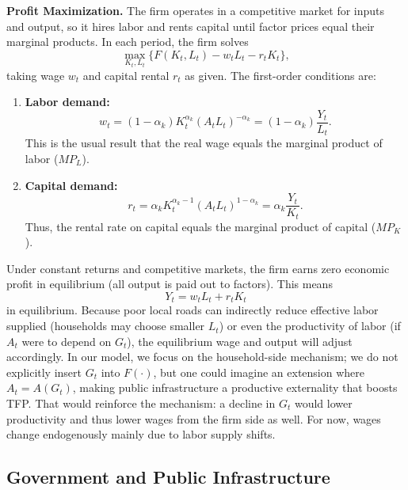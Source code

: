 {\bf Profit Maximization.}
The firm operates in a competitive market for inputs and output, so it hires labor and rents capital until factor prices equal their marginal products. In each period, the firm solves
\begin{equation}
\max_{K_t,L_t} \bigl\{F(K_t,L_t) - w_t L_t - r_t K_t\bigr\},
\end{equation}
taking wage $w_t$ and capital rental $r_t$ as given. The first-order conditions are:
\begin{enumerate}
    \item \textbf{Labor demand:}
        \begin{equation}
        w_t = (1-\alpha_k)K_t^{\alpha_k}(A_t L_t)^{-\alpha_k} = (1-\alpha_k)\frac{Y_t}{L_t}.
        \end{equation}
        This is the usual result that the real wage equals the marginal product of labor ($MP_L$).
    \item \textbf{Capital demand:}
        \begin{equation}
        r_t = \alpha_k K_t^{\alpha_k-1}(A_t L_t)^{1-\alpha_k} = \alpha_k\frac{Y_t}{K_t}.
        \end{equation}
        Thus, the rental rate on capital equals the marginal product of capital ($MP_K$).
\end{enumerate}
Under constant returns and competitive markets, the firm earns zero economic profit in equilibrium (all output is paid out to factors). This means
\begin{equation}
Y_t = w_t L_t + r_t K_t
\end{equation}
in equilibrium. Because poor local roads can indirectly reduce effective labor supplied (households may choose smaller $L_t$) or even the productivity of labor (if $A_t$ were to depend on $G_t$), the equilibrium wage and output will adjust accordingly. In our model, we focus on the household-side mechanism; we do not explicitly insert $G_t$ into $F(\cdot)$, but one could imagine an extension where $A_t = A(G_t)$, making public infrastructure a productive externality that boosts TFP. That would reinforce the mechanism: a decline in $G_t$ would lower productivity and thus lower wages from the firm side as well. For now, wages change endogenously mainly due to labor supply shifts.

\subsection{Government and Public Infrastructure}

